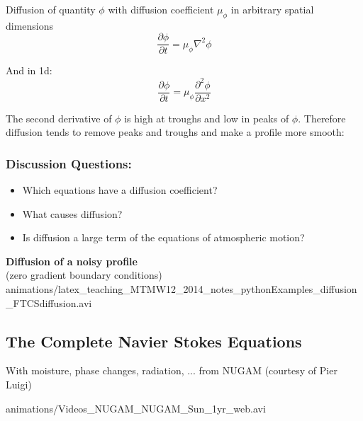 \begin{minipage}[t]{0.47\columnwidth}%
Diffusion of quantity $\phi$ with diffusion coefficient $\mu_{\phi}$
in arbitrary spatial dimensions
\[
\frac{\partial\phi}{\partial t}=\mu_{\phi}\nabla^{2}\phi
\]


And in 1d:
\[
\frac{\partial\phi}{\partial t}=\mu_{\phi}\frac{\partial^{2}\phi}{\partial x^{2}}
\]


\begin{flushleft}
The second derivative of $\phi$ is high at troughs and low in peaks
of $\phi$. Therefore diffusion tends to remove peaks and troughs
and make a profile more smooth:
\par\end{flushleft}


\subsubsection*{Discussion Questions:}
\begin{itemize}
\item Which equations have a diffusion coefficient?
\item What causes diffusion?
\item Is diffusion a large term of the equations of atmospheric motion?\end{itemize}
%
\end{minipage}\hfill{}%
\begin{minipage}[t]{0.49\columnwidth}%
\centering \textbf{Diffusion of a noisy profile}\\
 (zero gradient boundary conditions) 
{animations/latex_teaching_MTMW12_2014_notes_pythonExamples_diffusion_FTCSdiffusion.avi}%
\end{minipage}

\clearpage{}


\subsection{The Complete Navier Stokes Equations}

With moisture, phase changes, radiation, ... from NUGAM (courtesy
of Pier Luigi)

{animations/Videos_NUGAM_NUGAM_Sun_1yr_web.avi}
